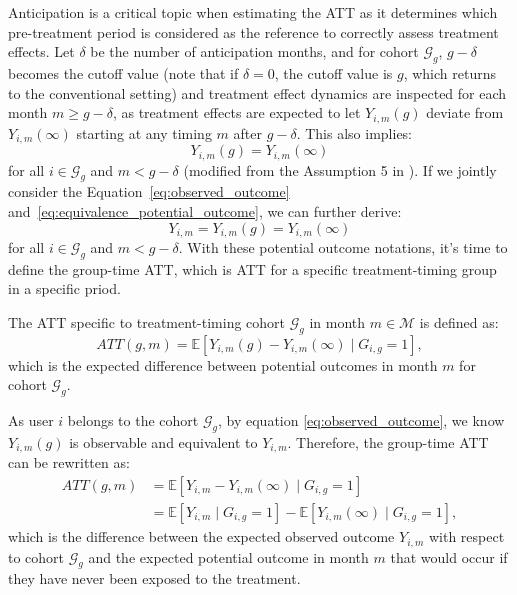 Anticipation is a critical topic when estimating the ATT as it determines which pre-treatment period is considered as the reference to correctly assess treatment effects. Let $\delta$ be the number of anticipation months, and for cohort $\mathcal{G}_g$, $g-\delta$ becomes the cutoff value (note that if $\delta=0$, the cutoff value is $g$, which returns to the conventional setting) and treatment effect dynamics are inspected for each month $m \geq g-\delta$, as treatment effects are expected to let $Y_{i, m}(g)$ deviate from $Y_{i, m}(\infty)$ starting at any timing $m$ after $g-\delta$. This also implies:
\begin{equation}\label{eq:equivalence_potential_outcome}
    Y_{i, m}(g) = Y_{i, m}(\infty)
\end{equation}
for all $i \in \mathcal{G}_g$ and $m < g - \delta$ (modified from the Assumption 5 in \cite{roth2023s}). If we jointly consider the Equation~\ref{eq:observed_outcome} and~\ref{eq:equivalence_potential_outcome}, we can further derive:
\begin{equation}\label{eq:equivalence_observed_outcome_pretreatment}
    Y_{i, m} = Y_{i, m}(g) = Y_{i, m}(\infty)
\end{equation}
for all $i \in \mathcal{G}_g$ and $m < g - \delta$.
With these potential outcome notations, it's time to define the group-time ATT, which is ATT for a specific treatment-timing group in a specific priod.

\begin{definition}\label{def:ATTgt}
The ATT specific to treatment-timing cohort $\mathcal{G}_g$ in month $m \in \mathcal{M}$ is defined as:
$$
ATT(g, m)
= \mathbb{E}[Y_{i, m}(g) - Y_{i, m}(\infty) \mid G_{i, g} = 1],
$$
which is the expected difference between potential outcomes in month $m$ for cohort $\mathcal{G}_g$.
\end{definition}

As user $i$ belongs to the cohort $\mathcal{G}_g$, by equation \ref{eq:observed_outcome}, we know $Y_{i, m}(g)$ is observable and equivalent to $Y_{i, m}$. Therefore, the group-time ATT can be rewritten as:
\begin{align}\label{def:ATTgt_v2}
ATT(g, m)
&=
\mathbb{E}[
    Y_{i, m} - Y_{i, m}(\infty)
    \mid G_{i, g} = 1
]
\nonumber \\
&=
\mathbb{E}[
    Y_{i, m}
    \mid G_{i, g} = 1
]
-
\mathbb{E}[
    Y_{i, m}(\infty)
    \mid G_{i, g} = 1
],
\end{align}
which is the difference between the expected observed outcome $Y_{i, m}$ with respect to cohort $\mathcal{G}_g$ and the expected potential outcome in month $m$ that would occur if they have never been exposed to the treatment.


